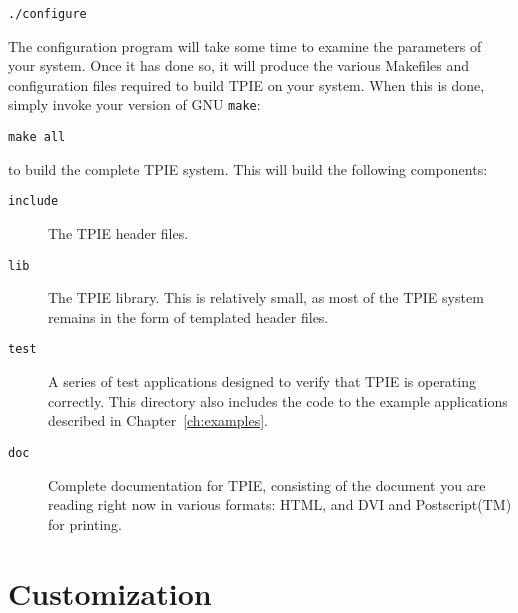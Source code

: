 \begin{verbatim}
./configure
\end{verbatim}

The configuration program will take some time to
examine the parameters of your system.  Once it has done so, it will
produce the various Makefiles and configuration files required to
build TPIE on your system.  When this is done, simply invoke your version
of GNU \verb|make|:

\begin{verbatim}
make all
\end{verbatim}

to build the complete TPIE system.  This will build the following
components:

\begin{description}
\item[\verb|include|] The TPIE header files.
\item[\verb|lib|] The TPIE library.  This is relatively small, as most
  of the TPIE system remains in the form of templated header
  files.
\item[\verb|test|] A series of test applications designed to verify
  that TPIE is operating correctly.  This directory also includes the
  code to the example applications described in
  Chapter~\ref{ch:examples}.
\item[\verb|doc|] Complete documentation for TPIE, consisting of the
  document you are reading right now in various formats: HTML, and DVI and
  Postscript(TM) for printing.
\end{description}





\section{Customization}

